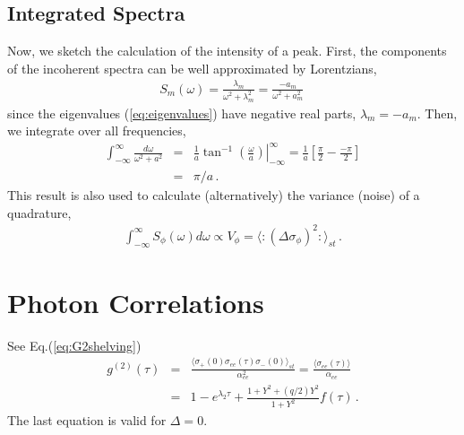 \documentclass[twocolumn,aps,eqsecnum,showkeys,amsmath]{revtex4-2}
\begin{document}
\subsection{Integrated Spectra} 
Now, we sketch the calculation of the intensity of a peak. First, the 
components of the incoherent spectra can be well approximated by 
Lorentzians, 
%
\begin{eqnarray} 
S_m(\omega) = \frac{\lambda_m}{\omega^2 +\lambda_m^2} 
	= \frac{- a_m}{\omega^2 +a_m^2} 	\,
\end{eqnarray}
since the eigenvalues (\ref{eq:eigenvalues}) have negative real parts, 
$\lambda_m = -a_m$. Then, we integrate over all frequencies, 
%
\begin{eqnarray} 
\int_{-\infty}^{\infty} \frac{d\omega}{\omega^2 +a^2} 
	&=& \left. \frac{1}{a} \tan^{-1}{\left( \frac{\omega}{a} \right)} 
		\right|_{-\infty}^{\infty} 
	=  \frac{1}{a} \left[ \frac{\pi}{2} -\frac{-\pi}{2} \right] 	\nonumber \\ 
	&=& \pi/a	\,.
\end{eqnarray}
This result is also used to calculate (alternatively) the variance (noise) 
of a quadrature,  
%
\begin{eqnarray} 
\int_{-\infty}^{\infty} S_{\phi}(\omega) d \omega \propto V_{\phi} 
	= \langle : (\Delta \sigma_{\phi})^2 :  \rangle_{st} 	\,. 
\end{eqnarray}


\section{Photon Correlations} 
See Eq.(\ref{eq:G2shelving})
%
\begin{eqnarray} 
g^{(2)} (\tau) &=& \frac{\langle \sigma_{+}(0)  \sigma_{ee} (\tau) 
 	\sigma_{-}(0) \rangle_{st}}{\alpha_{ee}^2} 
	= \frac{\langle \sigma_{ee} (\tau) \rangle}{\alpha_{ee}} 	\\
&=& 1- e^{\lambda_2 \tau} +\frac{ 1+ Y^2 +(q/2)Y^2 }{1+ Y^2} f(\tau)  \,.
	\nonumber 
\end{eqnarray}
The last equation is valid for $\Delta=0$. 
\end{document}
